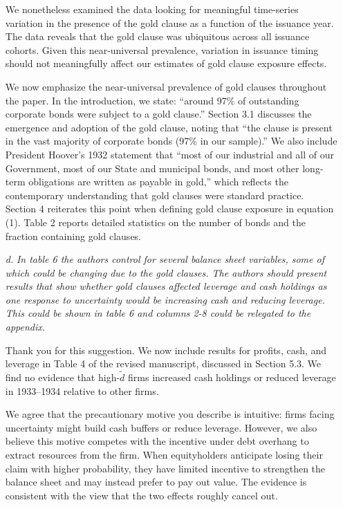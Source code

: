 \begin{itemize}
    We nonetheless examined the data looking for meaningful time-series variation in the presence of the gold clause as a function of the issuance year. The data reveals that the gold clause was ubiquitous across all issuance cohorts. Given this near-universal prevalence, variation in issuance timing should not meaningfully affect our estimates of gold clause exposure effects.

    We now emphasize the near-universal prevalence of gold clauses throughout the paper. In the introduction, we state: ``around 97\% of outstanding corporate bonds were subject to a gold clause.'' Section 3.1 discusses the emergence and adoption of the gold clause, noting that ``the clause is present in the vast majority of corporate bonds (97\% in our sample).'' We also include President Hoover's 1932 statement that ``most of our industrial and all of our Government, most of our State and municipal bonds, and most other long-term obligations are written as payable in gold,'' which reflects the contemporary understanding that gold clauses were standard practice. Section 4 reiterates this point when defining gold clause exposure in equation (1). Table 2 reports detailed statistics on the number of bonds and the fraction containing gold clauses.

    \item[\textit{\textcolor{red!60!black}{d.}}] \textit{\textcolor{red!60!black}{
    In table 6 the authors control for several balance sheet variables, some of which could be changing due to the gold clauses. The authors should present results that show whether gold clauses affected leverage and cash holdings as one response to uncertainty would be increasing cash and reducing leverage. This could be shown in table 6 and columns 2-8 could be relegated to the appendix.
    }}

    \bigskip

    \noindent Thank you for this suggestion. We now include results for profits, cash, and leverage in Table 4 of the revised manuscript, discussed in Section 5.3. We find no evidence that high-$\tilde{d}$ firms increased cash holdings or reduced leverage in 1933--1934 relative to other firms. 
    
    We agree that the precautionary motive you describe is intuitive: firms facing uncertainty might build cash buffers or reduce leverage. However, we also believe this motive competes with the incentive under debt overhang to extract resources from the firm. When equityholders anticipate losing their claim with higher probability, they have limited incentive to strengthen the balance sheet and may instead prefer to pay out value. The evidence is consistent with the view that the two effects roughly cancel out.


\end{itemize}
